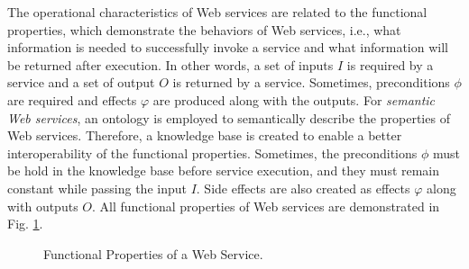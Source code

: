 The operational characteristics of Web services are related to the functional properties, which demonstrate the behaviors of Web services, i.e., what information is needed to successfully invoke a service and what information will be returned after execution. In other words, a set of inputs $I$ is required by a service and a set of output $O$ is returned by a service. Sometimes, preconditions $\phi$ are required and effects $\varphi$ are produced along with the outputs. For \emph{semantic Web services}, an ontology is employed to semantically describe the properties of Web services. Therefore, a knowledge base is created to enable a better interoperability of the functional properties. Sometimes, the preconditions $\phi$ must be hold in the knowledge base before service execution, and they must remain constant while passing the input $I$. Side effects are also created as effects $\varphi$ along with outputs $O$. All functional properties of Web services are demonstrated in Fig. \ref{fig:ws}.


\begin{figure}
\centerline{
}
\caption{Functional Properties of a Web Service.}
\label{fig:ws}
\end{figure}


